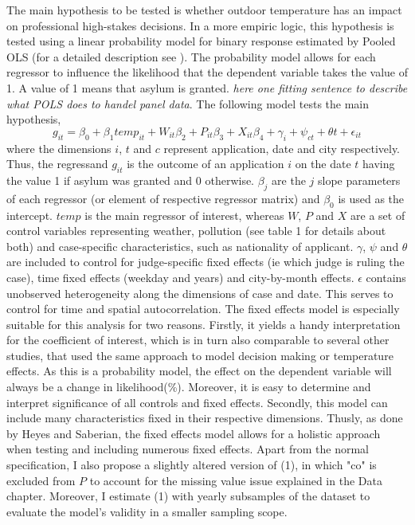 \documentclass[11pt]{article}
\begin{document}
	The main hypothesis to be tested is whether outdoor temperature has an impact on professional high-stakes decisions. In a more empiric logic, this hypothesis is tested using a linear probability model for binary response estimated by Pooled OLS (for a detailed description see \cite{wooldridge2010econometric}). The probability model allows for each regressor to influence the likelihood that the dependent variable takes the value of 1. A value of 1 means that asylum is granted. \textit{here one fitting sentence to describe what POLS does to handel panel data}. The following model tests the main hypothesis, 
	\newline
	\begin{equation}
		g_{ it } = \beta_{0} + \beta_{1 }temp_{it} + W_{it}\beta_{2} + P_{it}\beta_{3} + X_{it}\beta_{4} + \gamma_{i} + \psi_{ct} + \theta{t} + \epsilon_{it}
	\end{equation}
	where the dimensions \(i\), \(t\) and \(c\) represent application, date and city respectively. Thus, the regressand \(g_{ it }\) is the outcome of an application \(i\) on the date \(t\) having the value 1 if asylum was granted and 0 otherwise. \(\beta_{j}\) are the \(j\) slope parameters of each regressor (or element of respective regressor matrix) and \(\beta_{0}\) is used as the intercept. \(temp\) is the main regressor of interest, whereas \(W\), \(P\) and \(X\) are a set of control variables representing weather, pollution (see table 1 for details about both) and case-specific characteristics, such as nationality of applicant. \(\gamma\), \(\psi\) and \(\theta\) are included to control for judge-specific fixed effects (ie which judge is ruling the case), time fixed effects (weekday and years) and city-by-month effects. \(\epsilon\) contains unobserved heterogeneity along the dimensions of case and date. This serves to control for time and spatial autocorrelation. 
	The fixed effects model is especially suitable for this analysis for two reasons. Firstly, it yields a handy interpretation for the coefficient of interest, which is in turn also comparable to several other studies, that used the same approach to model decision making or temperature effects. As this is a probability model, the effect on the dependent variable will always be a change in likelihood(\%). Moreover, it is easy to determine and interpret significance of all controls and fixed effects. Secondly, this model can include many characteristics fixed in their respective dimensions. Thusly, as done by Heyes and Saberian, the fixed effects model allows for a holistic approach when testing and including numerous fixed effects.
	Apart from the normal specification, I also propose a slightly altered version of (1), in which "co" is excluded from \(P\) to account for the missing value issue explained in the Data chapter. Moreover, I estimate (1) with yearly subsamples of the dataset to evaluate the model's validity in a smaller sampling scope.
\end{document}
